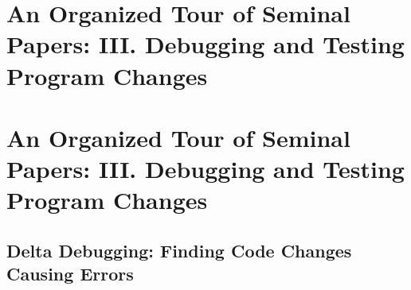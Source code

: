 \documentclass[runningheads,a4paper]{llncs}
\begin{document}

\section{An Organized Tour of Seminal Papers: III. Debugging and Testing Program Changes}
\label{sec:debugtest}


\section{An Organized Tour of Seminal Papers: III. Debugging and Testing Program Changes} 


\subsection{Delta Debugging: Finding Code Changes Causing Errors}
\end{document}
